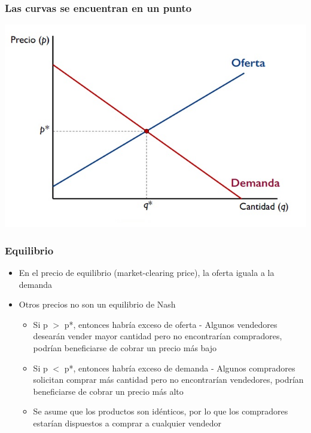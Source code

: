 \documentclass{beamer}
\begin{document}
\begin{frame}
\frametitle{Las curvas se encuentran en un punto}
\includegraphics[scale=0.6]{../Figures/Tema_07.3_equilibrioofertademanda_0.jpg}
\end{frame}

\begin{frame}
\frametitle{Equilibrio}
\begin{itemize}
    \item En el precio de equilibrio (market-clearing price), la oferta iguala a la demanda
    \item Otros precios no son un equilibrio de Nash
    \begin{itemize}
        \item Si p $>$ p*, entonces habría exceso de oferta %
        - Algunos vendedores desearán vender mayor cantidad pero no encontrarían compradores, podrían beneficiarse de cobrar un precio más bajo
        \item Si p $<$ p*, entonces habría exceso de demanda %
        - Algunos compradores solicitan comprar más cantidad pero no encontrarían vendedores, podrían beneficiarse de cobrar un precio más alto
        \item Se asume que los productos son idénticos, por lo que los compradores estarían dispuestos a comprar a cualquier vendedor
    \end{itemize}
\end{itemize}
\end{frame}
\end{document}

